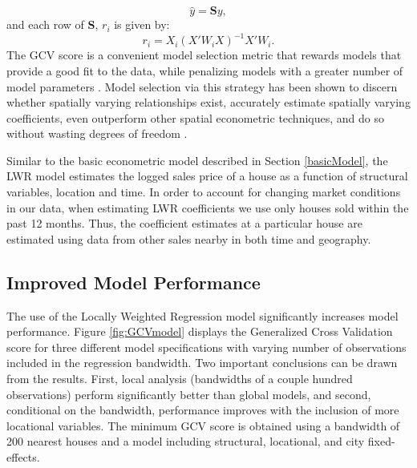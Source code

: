 \documentclass{article}\usepackage{graphicx, color}
\begin{document}
                   \begin{equation*}
                   \hat{y}=\textbf{S}y,
                   \end{equation*}
                   and each row of \textbf{S}, $r_i$ is given by:
                     \begin{equation*}
                   r_i=X_i(X'W_iX)^{-1}X'W_i.
                   \end{equation*}
The GCV score is a convenient model selection metric that rewards models that provide a good fit to the data, while penalizing models with a greater number of model parameters \citep{Loader1999, McMillen2010}. Model selection via this strategy has been shown to discern whether spatially varying relationships exist, accurately estimate spatially varying coefficients, even outperform other spatial econometric techniques, and do so without wasting degrees of freedom \citep{Paez2011, McMillen2010, McMillen2012}. 

Similar to the basic econometric model described in Section \ref{basicModel}, the LWR model estimates the logged sales price of a house as a function of structural variables, location and time. In order to account for changing market conditions in our data, when estimating LWR coefficients we use only houses sold within the past 12 months. Thus, the coefficient estimates at a particular house are estimated using data from other sales nearby in both time and geography.

\subsection{Improved Model Performance}
The use of the Locally Weighted Regression model significantly increases model performance. Figure \ref{fig:GCVmodel} displays the Generalized Cross Validation score for three different model specifications with varying number of observations included in the regression bandwidth. Two important conclusions can be drawn from the results. First, local analysis (bandwidths of a couple hundred observations) perform significantly better than global models, and second, conditional on the bandwidth, performance improves with the inclusion of more locational variables. The minimum GCV score is obtained using a bandwidth of 200 nearest houses and a model including structural, locational, and city fixed-effects.
\end{document}
